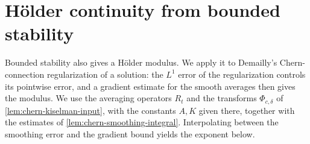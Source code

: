 \section{H\"older continuity from bounded stability}
\label{sec:holder-from-stability}

Bounded stability also gives a H\"older modulus. We apply it to Demailly's Chern-connection regularization of a solution: the $L^1$ error of the regularization controls its pointwise error, and a gradient estimate for the smooth averages then gives the modulus. We use the averaging operators $R_t$ and the transforms $\Phi_{c,\delta}$ of \cref{lem:chern-kiselman-input}, with the constants $A,K$ given there, together with the estimates of \cref{lem:chern-smoothing-integral}. Interpolating between the smoothing error and the gradient bound yields the exponent below.

